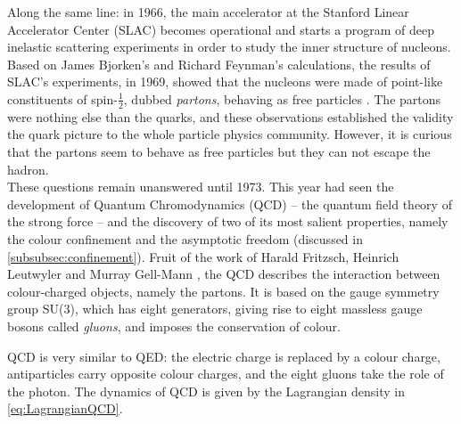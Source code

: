 Along the same line: in 1966, the main accelerator at the Stanford Linear Accelerator Center (SLAC) becomes operational and starts a program of deep inelastic scattering experiments in order to study the inner structure of nucleons. Based on James Bjorken's \cite{bjorkenCurrentAlgebraSmall2018} and Richard Feynman's  \cite{feynmanBehaviorHadronCollisions1988} calculations, the results of SLAC's experiments, in 1969, showed that the nucleons were made of point-like constituents of spin-$\frac{1}{2}$, dubbed \textit{partons}, behaving as free particles \cite{peskinIntroductionQuantumField2018}. The partons were nothing else than the quarks, and these observations established the validity the quark picture to the whole particle physics community. However, it is curious that the partons seem to behave as free particles but they can not escape the hadron.\\

These questions remain unanswered until 1973. This year had seen the development of Quantum Chromodynamics (QCD) -- the quantum field theory of the strong force -- and the discovery of two of its most salient properties, namely the colour confinement and the asymptotic freedom (discussed in \Sec\ref{subsubsec:confinement}). Fruit of the work of Harald Fritzsch, Heinrich Leutwyler and Murray Gell-Mann \cite{fritzschAdvantagesColorOctet1973}, the QCD describes the interaction between colour-charged objects, namely the partons. It is based on the gauge symmetry group SU(3), which has eight generators, giving rise to eight massless gauge bosons called \textit{gluons}, and imposes the conservation of colour. 

QCD is very similar to QED: the electric charge is replaced by a colour charge, antiparticles carry opposite colour charges, and the eight gluons take the role of the photon. The dynamics of QCD is given by the Lagrangian density in \eq\ref{eq:LagrangianQCD}.\\

